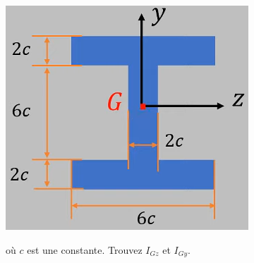 \documentclass[lecture.tex]{subfiles}
\begin{document}
\exercice{}

\begin{center}
  \includegraphics[scale=0.5]{figA0035.png}
\end{center}

où $c$ est une constante. Trouvez $I_{Gz}$ et $I_{Gy}$.

\finexercice
\end{document}

